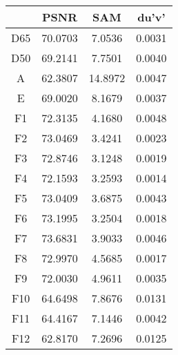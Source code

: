 \begin{tabular}{cccc}
  \hline
   & PSNR & SAM & du'v' \\
  \hline
  D65 & 70.0703 & 7.0536 & 0.0031 \\
  D50 & 69.2141 & 7.7501 & 0.0040 \\
  A & 62.3807 & 14.8972 & 0.0047 \\
  E & 69.0020 & 8.1679 & 0.0037 \\
  F1 & 72.3135 & 4.1680 & 0.0048 \\
  F2 & 73.0469 & 3.4241 & 0.0023 \\
  F3 & 72.8746 & 3.1248 & 0.0019 \\
  F4 & 72.1593 & 3.2593 & 0.0014 \\
  F5 & 73.0409 & 3.6875 & 0.0043 \\
  F6 & 73.1995 & 3.2504 & 0.0018 \\
  F7 & 73.6831 & 3.9033 & 0.0046 \\
  F8 & 72.9970 & 4.5685 & 0.0017 \\
  F9 & 72.0030 & 4.9611 & 0.0035 \\
  F10 & 64.6498 & 7.8676 & 0.0131 \\
  F11 & 64.4167 & 7.1446 & 0.0042 \\
  F12 & 62.8170 & 7.2696 & 0.0125 \\
  \hline
\end{tabular}
